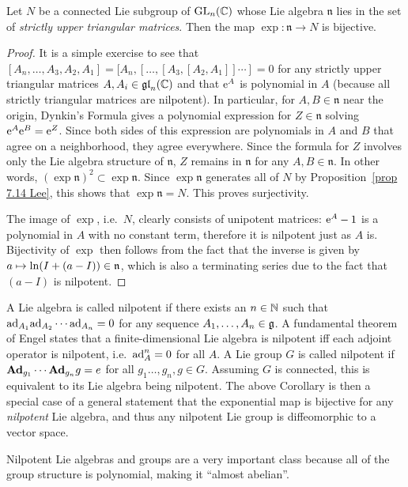 \begin{cor}\label{cor 5.16 Sepanski}
    Let $N$ be a connected Lie subgroup of $\operatorname{GL}_n(\mathbb{C})$ whose Lie algebra $\mathfrak{n}$ lies in the set of \emph{strictly upper triangular matrices}. Then the map $\exp:\mathfrak{n}\to N$ is bijective. 
\end{cor}
\begin{proof}
    It is a simple exercise to see that $[A_n,\ldots,A_3,A_2,A_1]=[A_n,[\ldots,[A_3,[A_2,A_1]]\cdots ]=0$ for any strictly upper triangular matrices $A,A_i\in \mathfrak{gl}_n(\mathbb{C})$ and that $\mathrm{e}^A$ is polynomial in $A$ (because all strictly triangular matrices are nilpotent). In particular, for $A,B\in\mathfrak{n}$ near the origin, Dynkin's Formula gives a polynomial expression for $Z\in\mathfrak{n}$ solving $\mathrm{e}^A\mathrm{e}^B=\mathrm{e}^Z$. Since both sides of this expression are polynomials in $A$ and $B$ that agree on a neighborhood, they agree everywhere. Since the formula for $Z$ involves only the Lie algebra structure of $\mathfrak{n}$, $Z$ remains in $\mathfrak{n}$ for any $A,B\in\mathfrak{n}$. In other words, $(\exp\mathfrak{n})^2\subset \exp\mathfrak{n}$. Since $\exp\mathfrak{n}$ generates all of $N$ by Proposition~\ref{prop 7.14 Lee}, this shows that $\exp\mathfrak{n}=N$. This proves surjectivity.

    The image of $\exp$, i.e.~$N$, clearly consists of unipotent matrices: $\mathrm{e}^A-1$ is a polynomial in $A$ with no constant term, therefore it is nilpotent just as $A$ is. Bijectivity of $\exp$ then follows from the fact that the inverse is given by $a\mapsto \ln (I+(a-I))\in\mathfrak{n}$, which is also a terminating series due to the fact that $(a-I)$ is nilpotent.
\end{proof}

\begin{rem}
    A Lie algebra is called nilpotent if there exists an $n\in\mathbb{N}$ such that $\mathrm{ad}_{A_1}\mathrm{ad}_{A_2}\cdots \mathrm{ad}_{A_n}=0$ for any sequence $A_1,\ldots,A_n\in\mathfrak{g}$. A fundamental theorem of Engel states that a finite-dimensional Lie algebra is nilpotent iff each adjoint operator is nilpotent, i.e.~$\mathrm{ad}_A^n=0$ for all $A$. A Lie group $G$ is called nilpotent if $\mathrm{\mathbf{Ad}}_{g_1}\cdots \mathrm{\mathbf{Ad}}_{g_n}g=e$ for all $g_1\ldots,g_n,g\in G$. Assuming $G$  is connected, this is equivalent to its Lie algebra being nilpotent. The above Corollary is then a special case of a general statement that the exponential map is bijective for any \emph{nilpotent} Lie algebra, and thus any nilpotent Lie group is diffeomorphic to a vector space.

    Nilpotent Lie algebras and groups are a very important class because all of the group structure is polynomial, making it ``almost abelian''.
\end{rem}






